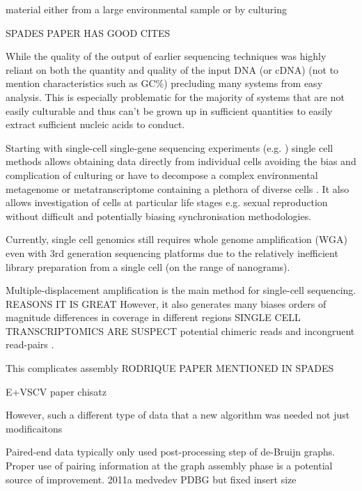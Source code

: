 material either from a large
environmental sample or by culturing 

SPADES PAPER HAS GOOD CITES


While the quality of the output of earlier sequencing techniques
was highly reliant on both the quantity and quality of the input DNA (or cDNA) (not to mention
characteristics such as GC\%) precluding many systems from easy analysis.  This is especially
problematic for the majority of systems that are not easily culturable and thus can't be
grown up in sufficient quantities to easily extract sufficient nucleic acids to conduct.

Starting with single-cell single-gene sequencing experiments (e.g. \citep{Kuppers1993}) 
single cell methods allows obtaining data directly from individual cells
avoiding the bias and complication of culturing or have to decompose a complex environmental
metagenome or metatranscriptome containing a plethora of diverse cells \citep{Blainey2013}.  It also allows 
investigation of cells at particular life stages e.g. sexual reproduction without difficult
and potentially biasing synchronisation methodologies.  



Currently, single cell genomics still requires whole genome amplification (WGA) even with 
3rd generation sequencing platforms due to the relatively inefficient library preparation
from a single cell (on the range of nanograms). \citep{Blainey2013} %
 


Multiple-displacement amplification \citep{Dean2001} is the main method for
single-cell sequencing.
REASONS IT IS GREAT
However, it also generates many biases orders of magnitude differences in coverage
in different regions 
SINGLE CELL TRANSCRIPTOMICS ARE SUSPECT
potential chimeric reads and incongruent read-pairs \citep{Bankevich2012}.

This complicates assembly RODRIQUE PAPER MENTIONED IN SPADES 


E+VSCV paper chisatz 

However, such a different type of data that a new algorithm was needed not just modificaitons \citep{Bankevich2012}

Paired-end data typically only used post-processing step of de-Bruijn graphs.
Proper use of pairing information at the graph assembly phase is a potential 
source of improvement.
2011a medvedev PDBG but fixed insert size

